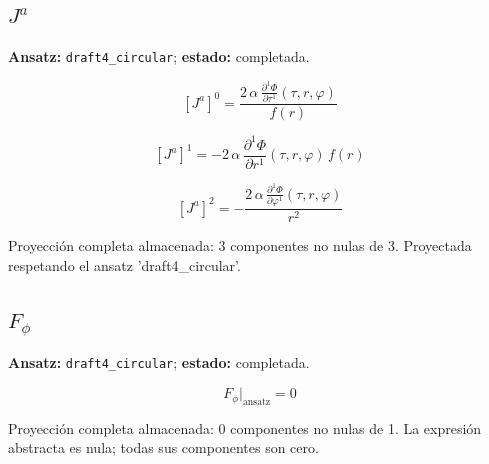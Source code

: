 \documentclass[11pt]{article}
\begin{document}
\subsection*{$ J^a $}
\textbf{Ansatz:} \texttt{draft4\_circular}; \textbf{estado:} completada.\par
\begin{dmath*}[breakdepth={5}]
\left[J^a\right]^{0} = \frac{2\,\alpha\,\frac{\partial^{1} \Phi}{\partial \tau^{1}}\!\left(\tau, r, \varphi\right)}{f\!\left(r\right)}
\end{dmath*}
\par\smallskip
\begin{dmath*}[breakdepth={5}]
\left[J^a\right]^{1} = -2\,\alpha\,\frac{\partial^{1} \Phi}{\partial r^{1}}\!\left(\tau, r, \varphi\right)\,f\!\left(r\right)
\end{dmath*}
\par\smallskip
\begin{dmath*}[breakdepth={5}]
\left[J^a\right]^{2} = -\frac{2\,\alpha\,\frac{\partial^{1} \Phi}{\partial \varphi^{1}}\!\left(\tau, r, \varphi\right)}{{r}^{2}}
\end{dmath*}
\par\smallskip
Proyección completa almacenada: 3 componentes no nulas de 3. Proyectada respetando el ansatz 'draft4\_circular'.\par\medskip
{}
\subsection*{$ F_{\phi} $}
\textbf{Ansatz:} \texttt{draft4\_circular}; \textbf{estado:} completada.\par
\begin{dmath*}[breakdepth={5}]
F_{\phi}\big|_{\mathrm{ansatz}} = 0
\end{dmath*}
\par\smallskip
Proyección completa almacenada: 0 componentes no nulas de 1. La expresión abstracta es nula; todas sus componentes son cero.\par\medskip
{}
\end{document}
